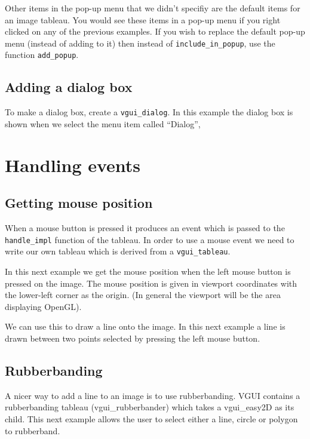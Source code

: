 \documentclass[12pt]{report}
\newcommand{\FSMinput}[1]{}
\begin{document}
Other items in the pop-up menu that we didn't specifiy are the default items for an
image tableau.  You would see these items in a pop-up menu if you right clicked on any
of the previous examples.  If you wish to replace the default pop-up menu (instead of
adding to it) then instead of {\tt include\_in\_popup}, use the function {\tt add\_popup}.

\section{Adding a dialog box}

To make a dialog box, create a {\tt vgui\_dialog}.  In this example the dialog box is
shown when we select the menu item called ``Dialog'',

\FSMinput{dialog-example}

\chapter{Handling events}

\section{Getting mouse position}

When a mouse button is pressed it produces an event which is passed to the
{\tt handle\_impl} function of the tableau.  In order to use a mouse event we need to write
our own tableau which is derived from a {\tt vgui\_tableau}.

In this next example we get the mouse position when the left mouse button is pressed on
the image.  The mouse position is given in viewport coordinates with the lower-left corner
as the origin. (In general the viewport will be the area displaying OpenGL).

\FSMinput{mouse-position}

We can use this to draw a line onto the image.  In this next example a line is drawn between
two points selected by pressing the left mouse button.
\FSMinput{mouse-draw-line}

\section{Rubberbanding}

A nicer way to add a line to an image is to use rubberbanding.  VGUI contains a
rubberbanding tableau (vgui\_rubberbander) which takes a vgui\_easy2D as its child.  This
next example allows the user to select either a line, circle or polygon to rubberband.
\FSMinput{rubberband}
\end{document}
